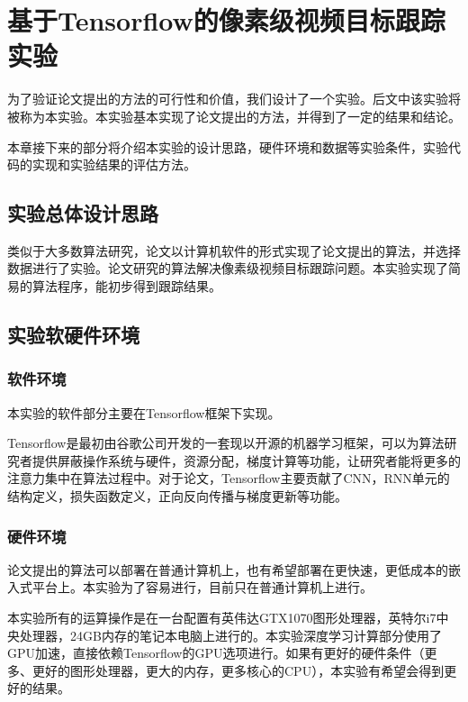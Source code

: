 
\chapter{基于Tensorflow的像素级视频目标跟踪实验} \label{section:experiment}
为了验证论文提出的方法的可行性和价值，我们设计了一个实验。后文中该实验将被称为本实验。本实验基本实现了论文提出的方法，并得到了一定的结果和结论。
\par
本章接下来的部分将介绍本实验的设计思路，硬件环境和数据等实验条件，实验代码的实现和实验结果的评估方法。

\section{实验总体设计思路}
类似于大多数算法研究，论文以计算机软件的形式实现了论文提出的算法，并选择数据进行了实验。论文研究的算法解决像素级视频目标跟踪问题。本实验实现了简易的算法程序，能初步得到跟踪结果。

\section{实验软硬件环境}
\subsection{软件环境}
本实验的软件部分主要在Tensorflow\supercite{abadi2016tensorflow}框架下实现。
\par
Tensorflow是最初由谷歌公司开发的一套现以开源的机器学习框架，可以为算法研究者提供屏蔽操作系统与硬件，资源分配，梯度计算等功能，让研究者能将更多的注意力集中在算法过程中。对于论文，Tensorflow主要贡献了CNN，RNN单元的结构定义，损失函数定义，正向反向传播与梯度更新等功能。

\subsection{硬件环境}
\par
论文提出的算法可以部署在普通计算机上，也有希望部署在更快速，更低成本的嵌入式平台上。本实验为了容易进行，目前只在普通计算机上进行。
\par
本实验所有的运算操作是在一台配置有英伟达GTX1070图形处理器，英特尔i7中央处理器，24GB内存的笔记本电脑上进行的。本实验深度学习计算部分使用了GPU加速，直接依赖Tensorflow的GPU选项进行。如果有更好的硬件条件（更多、更好的图形处理器，更大的内存，更多核心的CPU），本实验有希望会得到更好的结果。

